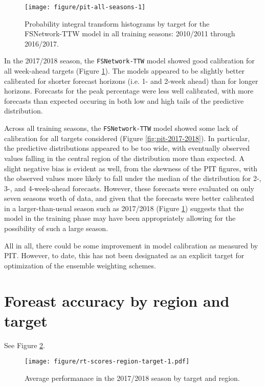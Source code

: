\documentclass{article}\usepackage[]{graphicx}\usepackage[]{color}
\makeatletter
\def\maxwidth{ %
  \ifdim\Gin@nat@width>\linewidth
    \linewidth
  \else
    \Gin@nat@width
  \fi
}
\newenvironment{knitrout}{}{} %
\makeatother
\begin{document}
\begin{knitrout}
\color{fgcolor}\begin{figure}
\texttt{[image: figure/pit-all-seasons-1]} \caption[Probability integral transform histograms by target for the FSNetwork-TTW model in all training seasons]{Probability integral transform histograms by target for the FSNetwork-TTW model in all training seasons: 2010/2011 through 2016/2017.}\label{fig:pit-all-seasons}
\end{figure}


\end{knitrout}

In the 2017/2018 season, the {\tt FSNetwork-TTW} model showed good calibration for all week-ahead targets (Figure \ref{fig:pit-all-seasons}). 
The models appeared to be slightly better calibrated for shorter forecast horizons (i.e. 1- and 2-week ahead) than for longer horizons. 
Forecasts for the peak percentage were less well calibrated, with more forecasts than expected occuring in both low and high tails of the predictive distribution.

Across all training seasons, the {\tt FSNetwork-TTW} model showed some lack of calibration for all targets considered (Figure \ref{fig:pit-2017-2018}).
In particular, the predictive distributions appeared to be too wide, with eventually observed values falling in the central region of the distribution more than expected. 
A slight negative bias is evident as well, from the skewness of the PIT figures, with the observed values more likely to fall under the median of the distribution for 2-, 3-, and 4-week-ahead forecasts.
However, these forecasts were evaluated on only seven seasons worth of data, and given that the forecasts were better calibrated in a larger-than-usual season such as 2017/2018 (Figure \ref{fig:pit-all-seasons}) suggests that the model in the training phase may have been appropriately allowing for the possibility of such a large season.

All in all, there could be some improvement in model calibration as measured by PIT. 
However, to date, this has not been designated as an explicit target for optimization of the ensemble weighting schemes.


\section{Foreast accuracy by region and target}

See Figure \ref{fig:regional-performance}.
\begin{figure}[htbp]
\begin{center}
\texttt{[image: figure/rt-scores-region-target-1.pdf]}
\caption{Average performanace in the 2017/2018 season by target and region.}
\label{fig:regional-performance}
\end{center}
\end{figure}
\end{document}
